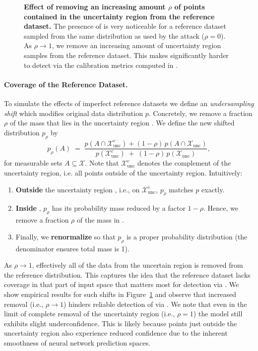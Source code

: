 \begin{figure}[t]
\caption[\textbf{Effect of removing an increasing amount $\rho$ of points contained in the uncertainty region from the reference dataset.}]{\textbf{Effect of removing an increasing amount $\rho$ of points contained in the uncertainty region from the reference dataset.} The presence of \attack is very noticeable for a reference dataset sampled from the same distribution as used by the attack ($\rho = 0$). As $\rho \rightarrow 1$, we remove an increasing amount of uncertainty region samples from the reference dataset. This makes \attack significantly harder to detect via the calibration metrics computed in \name.}
\label{fig:ref_abl}
\end{figure}


\paragraph{Coverage of the Reference Dataset.} 

To simulate the effects of imperfect reference datasets we define an \textit{undersampling shift} which modifies original data distribution \(p\). Concretely, we remove a fraction \(\rho\) of the mass that lies in the uncertainty region \uncertreg. We define the new shifted distribution \(p_{\rho}\) by
\[
p_{\rho}(A) \;=\; \frac{p(A \cap \mathcal{X}_\text{unc}^{c}) + (1-\rho)\, p(A \cap \mathcal{X}_\text{unc})}%
                       {p(\mathcal{X}_\text{unc}^{c}) \;+\; (1-\rho)\, p(\mathcal{X}_\text{unc})},
\]
for measurable sets \(A \subseteq \mathcal{X}\). Note that $\mathcal{X}_\text{unc}^c$ denotes the complement of the uncertainty region, i.e. all points outside of the uncertainty region. Intuitively:
\begin{enumerate}
    \item \textbf{Outside} the uncertainty region \uncertreg, i.e., on $\mathcal{X}_\text{unc}^c$, \(p_{\rho}\) matches \(p\) exactly.
    \item \textbf{Inside} \uncertreg, \(p_{\rho}\) has its probability mass reduced by a factor \(1-\rho\). Hence, we remove a fraction \(\rho\) of the mass in \uncertreg.
    \item Finally, we \textbf{renormalize} so that \(p_{\rho}\) is a proper probability distribution (the denominator ensures total mass is 1).
\end{enumerate}

As \(\rho \to 1\), effectively all of the data from the uncertain region is removed from the reference distribution. This captures the idea that the reference dataset lacks coverage in that part of input space that matters most for detection via \name. We show empirical results for such shifts in Figure~\ref{fig:ref_abl} and observe that increased removal (i.e., $\rho \rightarrow 1$) hinders reliable detection of \attack via \name. We note that even in the limit of complete removal of the uncertainty region (i.e., $\rho = 1$) the model still exhibits slight underconfidence. This is likely because points just outside the uncertainty region also experience reduced confidence due to the inherent smoothness of neural network prediction spaces.

